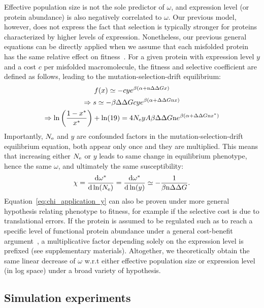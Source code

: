 Effective population size is not the sole predictor of $\omega$, and expression level (or protein abundance) is also negatively correlated to $\omega$.
Our previous model, however, does not express the fact that selection is typically stronger for proteins characterized by higher levels of expression.
Nonetheless, our previous general equations can be directly applied when we assume that each misfolded protein has the same relative effect on fitness~\citep{Drummond2005a, Wilke2006, Drummond2008, Serohijos2012}.
For a given protein with expression level $y$ and a cost $c$ per misfolded macromolecule, the fitness and selective coefficient are defined as follows, leading to the mutation-selection-drift equilibrium:
\begin{gather}
    f (x) \simeq - c y e^{\beta (\alpha + \text{n} \Delta \Delta G x)} \\
    \Rightarrow s \simeq - \beta \Delta \Delta G c y e^{\beta(\alpha + \Delta \Delta G \text{n} x)} \\
    \Rightarrow \ln \left( \frac{1 - x^{*}}{x^{*}} \right) + \ln (19) = 4N_{\mathrm{e}} y A \beta \Delta \Delta G \text{n} e^{\beta(\alpha + \Delta \Delta G \text{n} x^{*})}
\end{gather}
Importantly, $N_{\mathrm{e}}$ and $y$ are confounded factors in the mutation-selection-drift equilibrium equation, both appear only once and they are multiplied.
This means that increasing either $N_{\mathrm{e}}$ or $y$ leads to same change in equilibrium phenotype, hence the same $\omega$, and ultimately the same susceptibility:
\begin{align}
    \chi = \frac{ \der \omega\eq}{\der \ln (\Ne)} = \frac{ \der \omega\eq}{\der \ln (y)} \simeq - \frac{1}{\beta \Nsite \DeltaDeltaG}. \label{eq:chi_application_y}
\end{align}
Equation~\ref{eq:chi_application_y} can also be proven under more general hypothesis relating phenotype to fitness, for example if the selective cost is due to translational errors.
If the protein is assumed to be regulated such as to reach a specific level of functional protein abundance under a general cost-benefit argument~\citep{Cherry2010,Gout2010}, a multiplicative factor depending solely on the expression level is prefixed (see supplementary materials).
Altogether, we theoretically obtain the same linear decrease of $\omega$ w.r.t either effective population size or expression level (in log space) under a broad variety of hypothesis.

\subsection{Simulation experiments}

